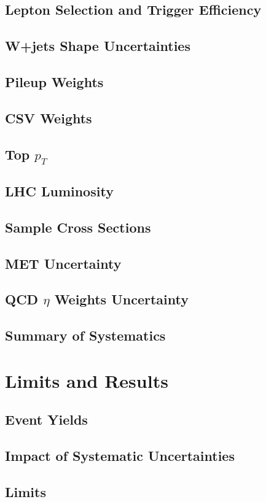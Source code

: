 \subsection{Lepton Selection and Trigger Efficiency}
\subsection{W+jets Shape Uncertainties}
\subsection{Pileup Weights}
\subsection{CSV Weights}
\subsection{Top $p_{T}$}
\subsection{LHC Luminosity}
\subsection{Sample Cross Sections}
\subsection{MET Uncertainty }
\subsection{QCD $\eta$ Weights Uncertainty}
\subsection{Summary of Systematics}

\section{Limits and Results}
\subsection{Event Yields}
\subsection{Impact of Systematic Uncertainties}
\subsection{Limits}